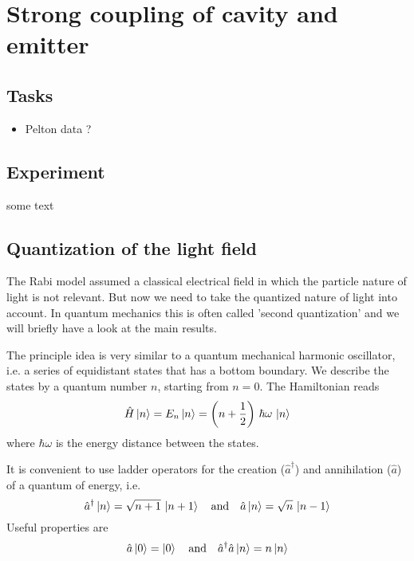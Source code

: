 \renewcommand{\lastmod}{April 15, 2020}


\chapter{Strong coupling of cavity and emitter}




\section{Tasks}

\begin{itemize}
\item Pelton data ?
\end{itemize}



\section{Experiment}

some text


\section{Quantization of the light field}
The Rabi model assumed a classical electrical field in which the particle nature of light is not relevant. But now we need to take the quantized nature of light into account. In quantum mechanics this is often called 'second quantization' and we will briefly have a look at the main results.

The principle idea is very similar to a quantum mechanical harmonic oscillator, i.e. a series of equidistant states that has a bottom boundary. We describe the states by a quantum number $n$, starting from $n=0$. The Hamiltonian reads
\[
\hat{H} \ket{n} = E_n \ket{n} = \left( n + \frac{1}{2} \right) \, \hbar \omega \, \ket{n}
\]
where $\hbar \omega$ is the energy distance between the states.

It is convenient to use ladder operators for the creation ($\hat{a}^\dagger$) and annihilation ($\hat{a}$) of  a quantum of energy, i.e.
\[
 \hat{a}^\dagger \ket{n} = \sqrt{n+1}\, \ket{n+1}  \quad \text{and} \quad
  \hat{a} \ket{n} = \sqrt{n}\, \ket{n-1}
\]
Useful properties are 
\[
 \hat{a} \ket{0} = \ket{0}  \quad \text{and} \quad
  \hat{a}^\dagger  \hat{a} \ket{n} = n \ket{n}
\]

